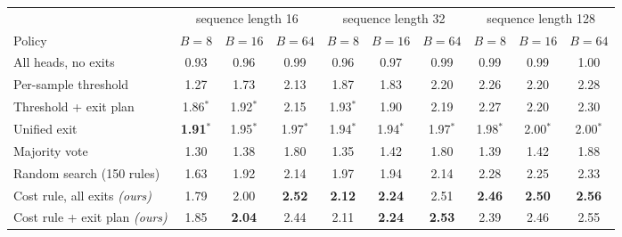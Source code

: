 \begin{tabular}{@{}lccccccccc@{}}
\toprule
 & \multicolumn{3}{c}{sequence length 16} & \multicolumn{3}{c}{sequence length 32} & \multicolumn{3}{c}{sequence length 128} \\
\cmidrule(lr){2-4}\cmidrule(lr){5-7}\cmidrule(lr){8-10}
Policy & $B=8$ & $B=16$ & $B=64$ & $B=8$ & $B=16$ & $B=64$ & $B=8$ & $B=16$ & $B=64$ \\
\midrule
All heads, no exits & 0.93 & 0.96 & 0.99 & 0.96 & 0.97 & 0.99 & 0.99 & 0.99 & 1.00 \\
\midrule
Per-sample threshold & 1.27 & 1.73 & 2.13 & 1.87 & 1.83 & 2.20 & 2.26 & 2.20 & 2.28 \\
Threshold + exit plan & 1.86$^{*}$ & 1.92$^{*}$ & 2.15 & 1.93$^{*}$ & 1.90 & 2.19 & 2.27 & 2.20 & 2.30 \\
Unified exit & \textbf{1.91}$^{*}$ & 1.95$^{*}$ & 1.97$^{*}$ & 1.94$^{*}$ & 1.94$^{*}$ & 1.97$^{*}$ & 1.98$^{*}$ & 2.00$^{*}$ & 2.00$^{*}$ \\
Majority vote & 1.30 & 1.38 & 1.80 & 1.35 & 1.42 & 1.80 & 1.39 & 1.42 & 1.88 \\
Random search (150 rules) & 1.63 & 1.92 & 2.14 & 1.97 & 1.94 & 2.14 & 2.28 & 2.25 & 2.33 \\
\midrule
Cost rule, all exits \textit{(ours)} & 1.79 & 2.00 & \textbf{2.52} & \textbf{2.12} & \textbf{2.24} & 2.51 & \textbf{2.46} & \textbf{2.50} & \textbf{2.56} \\
Cost rule + exit plan \textit{(ours)} & 1.85 & \textbf{2.04} & 2.44 & 2.11 & \textbf{2.24} & \textbf{2.53} & 2.39 & 2.46 & 2.55 \\
\bottomrule
\end{tabular}
